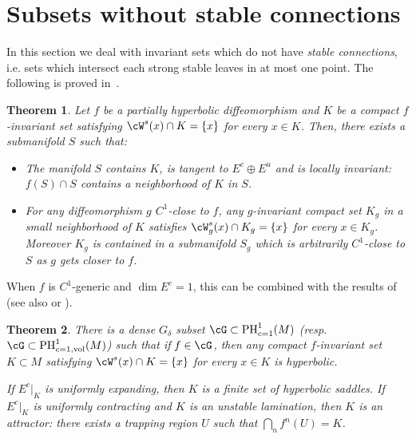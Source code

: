 \documentclass[a4paper,11pt]{amsart}
\numberwithin{equation}{section}     %
\newtheorem{teo}{Theorem}[section]
\theoremstyle{definition}
\theoremstyle{remark}
\begin{document}
\section{Subsets without stable connections}\label{s.surface} 

In this section we deal with invariant sets which do not have \emph{stable connections}, i.e. sets which intersect each strong stable leaves in at most one point. The following is proved in~\cite{BC-Center}.
\begin{teo}\label{teo-surface}
Let $f$ be a partially hyperbolic diffeomorphism and $K$ be a compact $f$-invariant set satisfying $\cW^s(x) \cap K = \{x\}$ for every $x \in K$. Then, there exists a submanifold $S$ such that:
\begin{itemize}
\item[--] The manifold $S$ contains $K$, is tangent to $E^{c}\oplus E^u$
and is locally invariant: $f(S)\cap S$ contains a neighborhood of $K$ in $S$.
\item[--] For any diffeomorphism $g$ $C^1$-close to $f$, any $g$-invariant compact set $K_g$ in a small neighborhood of $K$ satisfies $\cW^s_g(x) \cap K_g = \{x\}$ for every $x \in K_g$. Moreover $K_g$ is contained in
a submanifold $S_g$ which is arbitrarily $C^1$-close to $S$ as $g$ gets closer to $f$.
\end{itemize}
\end{teo}

When $f$ is $C^1$-generic and $\dim E^c=1$, this can be combined with the results of \cite{PS-IHP} (see also \cite[Corollary 2.31]{CP} or \cite{CPS}).

\begin{teo}\label{teo-hyp}
There is a dense $G_\delta$ subset $\cG \subset \mathrm{PH}^1_{c=1}(M)$ (resp. $\cG \subset \mathrm{PH}^1_{c=1,\mathrm{vol}}(M)$) such that if $f \in \cG$, then any compact $f$-invariant set $K \subset M$ satisfying $\cW^s(x) \cap K = \{x\}$ for every $x \in K$ is hyperbolic.

If $E^c|_{K}$ is uniformly expanding, then $K$ is a finite set of hyperbolic saddles.
If $E^c|_{K}$ is uniformly contracting and $K$ is an unstable lamination, then $K$ is
an attractor: there exists a trapping region $U$ such that $\bigcap_n f^n(U)=K$.
\end{teo}
\end{document}
